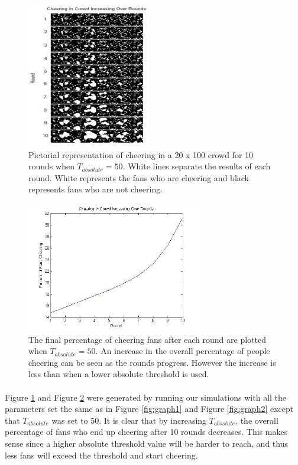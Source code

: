 \documentclass[oneside,12pt]{report}
\begin{document}
\begin{figure}[h]
    \begin{center}
        \includegraphics[height=2.5in]{sample_graph3.jpg}
    \end{center}
    \caption[Pictorial representation of the progression of cheering over time with a higher absolute threshold.]{Pictorial representation of cheering in a 20 x 100 crowd for 10 rounds when $T_{absolute}=50$. White lines separate the results of each round. White represents the fans who are cheering and black represents fans who are not cheering.}
    \label{fig:graph3}
\end{figure}

\begin{figure}[h]
    \begin{center}
        \includegraphics[width=3in]{sample_graph4.jpg}
    \end{center}
    \caption[Plot of cheering levels over time in a simulated crowd with a higher absolute threshold.]{The final percentage of cheering fans after each round are plotted when $T_{absolute}=50$. An increase in the overall percentage of people cheering can be seen as the rounds progress. However the increase is less than when a lower absolute threshold is used.}
    \label{fig:graph4}
\end{figure}

\paragraph{}
Figure \ref{fig:graph3} and Figure \ref{fig:graph4} were generated by running our simulations with all the parameters set the same as in Figure \ref{fig:graph1} and Figure \ref{fig:graph2} except that $T_{absolute}$ was set to 50. It is clear that by increasing $T_{absolute}$, the overall percentage of fans who end up cheering after 10 rounds decreases. This makes sense since a higher absolute threshold value will be harder to reach, and thus less fans will exceed the threshold and start cheering. 
\end{document}
